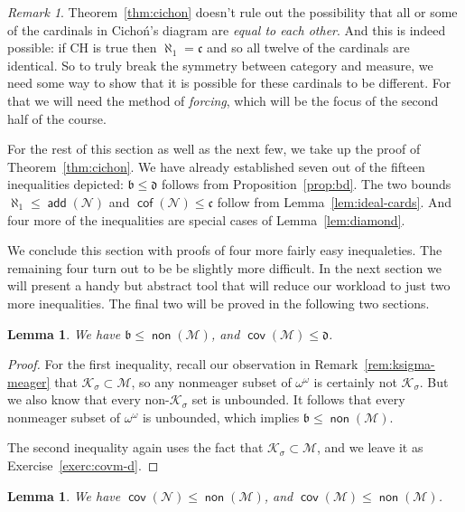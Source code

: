 \documentclass[11pt,oneside]{amsbook}
\newcommand{\Null}{\mathcal N}
\newcommand{\Meager}{\mathcal M}
\newcommand{\Ksigma}{\mathcal K_\sigma}
\DeclareMathOperator{\add}{\mathsf{add}}
\DeclareMathOperator{\non}{\mathsf{non}}
\DeclareMathOperator{\cov}{\mathsf{cov}}
\DeclareMathOperator{\cof}{\mathsf{cof}}
\theoremstyle{definition}
\theoremstyle{plain}
\newtheorem{lem}[thm]{Lemma}
\theoremstyle{definition}
\theoremstyle{remark}
\newtheorem{rem}[thm]{Remark}
\begin{document}
\begin{rem}
  Theorem~\ref{thm:cichon} doesn't rule out the possibility that all or some of the cardinals in Cicho\'n's diagram are \emph{equal to each other}. And this is indeed possible: if CH is true then $\aleph_1=\mathfrak c$ and so all twelve of the cardinals are identical. So to truly break the symmetry between category and measure, we need some way to show that it is possible for these cardinals to be different. For that we will need the method of \emph{forcing}, which will be the focus of the second half of the course.
\end{rem}

For the rest of this section as well as the next few, we take up the proof of Theorem~\ref{thm:cichon}. We have already established seven out of the fifteen inequalities depicted: $\mathfrak b\leq\mathfrak d$ follows from Proposition~\ref{prop:bd}. The two bounds $\aleph_1\leq\add(\Null)$ and $\cof(\Null)\leq\mathfrak c$ follow from Lemma~\ref{lem:ideal-cards}. And four more of the inequalities are special cases of Lemma~\ref{lem:diamond}.

We conclude this section with proofs of four more fairly easy inequaleties. The remaining four turn out to be be slightly more difficult. In the next section we will present a handy but abstract tool that will reduce our workload to just two more inequalities. The final two will be proved in the following two sections.

\begin{lem}
  \label{lem:b-nonm}
  We have $\mathfrak b\leq\non(\Meager)$, and $\cov(\Meager)\leq\mathfrak d$.
\end{lem}

\begin{proof}
  For the first inequality, recall our observation in Remark~\ref{rem:ksigma-meager} that $\Ksigma\subset\Meager$, so any nonmeager subset of $\omega^\omega$ is certainly not $\Ksigma$. But we also know that every non-$\Ksigma$ set is unbounded. It follows that every nonmeager subset of $\omega^\omega$ is unbounded, which implies $\mathfrak b\leq\non(\Meager)$.

  The second inequality again uses the fact that $\Ksigma\subset\Meager$, and we leave it as Exercise~\ref{exerc:covm-d}.
\end{proof}

\begin{lem}
  \label{lem:covn-nonm}
  We have $\cov(\Null)\leq\non(\Meager)$, and $\cov(\Meager)\leq\non(\Meager)$.
\end{lem}
\end{document}
